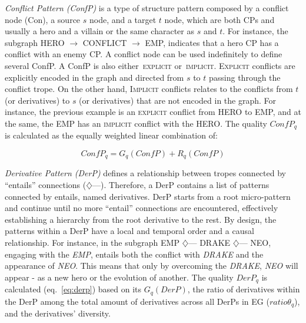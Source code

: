 \emph{Conflict Pattern (ConfP)} is a type of structure pattern composed by a conflict node (Con), a source $s$ node, and a target $t$ node, which are both CPs and usually a hero and a villain or the same character as $s$ and $t$. For instance, the subgraph HERO $\rightarrow$ CONFLICT $\rightarrow$ EMP, indicates that a hero CP has a conflict with an enemy CP. A conflict node can be used indefinitely to define several ConfP. A ConfP is also either~\textsc{explicit} or~\textsc{implicit}. \textsc{Explicit} conflicts are explicitly encoded in the graph and directed from $s$ to $t$ passing through the conflict trope. On the other hand, \textsc{Implicit} conflicts relates to the conflicts from $t$ (or derivatives) to $s$ (or derivatives) that are not encoded in the graph. For instance, the previous example is an \textsc{explicit} conflict from HERO to EMP, and at the same, the EMP has an \textsc{implicit} conflict with the HERO. The quality $ConfP_{q}$ is calculated as the equally weighted linear combination of:

\begin{equation}
    ConfP_{q} = G_{q}(ConfP) + R_{q}(ConfP)%
\end{equation}


\emph{Derivative Pattern (DerP)} defines a relationship between tropes connected by ``entails'' connections ($\diamondsuit$---). Therefore, a DerP contains a list of patterns connected by entails, named derivatives. DerP starts from a root micro-pattern and continue until no more ``entail'' connections are encountered, effectively establishing a hierarchy from the root derivative to the rest. By design, the patterns within a DerP have a local and temporal order and a causal relationship. For instance, in the subgraph EMP $\diamondsuit$--- DRAKE $\diamondsuit$--- NEO, engaging with the \emph{EMP}, entails both the conflict with \emph{DRAKE} and the appearance of \emph{NEO}. This means that only by overcoming the \emph{DRAKE}, \emph{NEO} will appear - as a new hero or the evolution of another. The quality $DerP_{q}$ is calculated (eq.~\ref{eq:derp}) based on its $G_{q}(DerP)$, the ratio of derivatives within the DerP among the total amount of derivatives across all DerPs in EG ($ratio\theta_{q}$), and the derivatives' diversity. 


